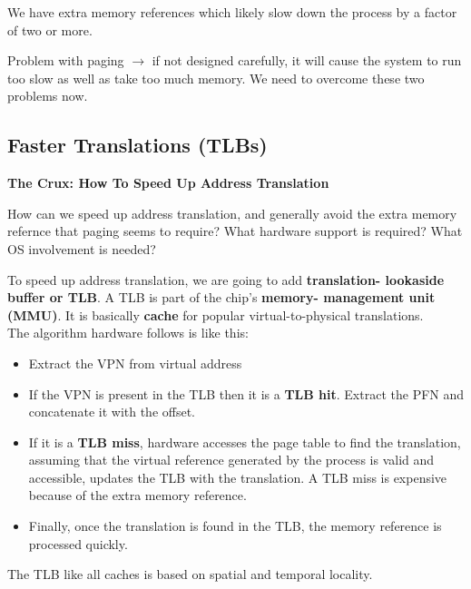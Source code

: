 We have extra memory references which likely slow down the process by a factor
of two or more.

Problem with paging $\rightarrow$ if not designed carefully, it will cause the
system to run too slow as well as take too much memory. We need to overcome 
these two problems now.

\subsection{Faster Translations (TLBs)}

\begin{tcolorbox}
    \begin{center}
        \textbf{The Crux: How To Speed Up Address Translation}
    \end{center}

    How can we speed up address translation, and generally avoid the extra
    memory refernce that paging seems to require? What hardware support is
    required? What OS involvement is needed? 
\end{tcolorbox}

To speed up address translation, we are going to add \textbf{translation-
lookaside buffer or TLB}. A TLB is part of the chip's \textbf{memory-
management unit (MMU)}. It is basically \textbf{cache} for popular
virtual-to-physical translations.\\

The algorithm hardware follows is like this:

\begin{itemize}
    \item Extract the VPN from virtual address
    \item If the VPN is present in the TLB then it is a \textbf{TLB hit}.
        Extract the PFN and concatenate it with the offset.
    \item If it is a \textbf{TLB miss}, hardware accesses the page table
        to find the translation, assuming that the virtual reference generated
        by the process is valid and accessible, updates the TLB with the
        translation. A TLB miss is expensive because of the extra memory
        reference.
    \item Finally, once the translation is found in the TLB, the memory 
        reference is processed quickly.
\end{itemize}

The TLB like all caches is based on spatial and temporal locality.

